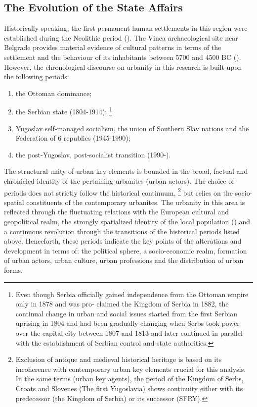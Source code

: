 \documentclass[11pt]{report}
\begin{document}
\subsection{The Evolution of the State Affairs}

Historically speaking, the first permanent human settlements in this region were established during the  Neolithic  period (\href{Krstic}{\citealt{krstic_planerski_1972}}). The Vinca archaeological site near Belgrade provides material evidence of cultural patterns in terms of the settlement and the behaviour of its inhabitants between 5700 and 4500 BC  (\href{Srejovic}{\citealt{srejovic_vincu_1984}}).
\\

However, the chronological discourse on urbanity in this research is built upon the following periods:

\begin{enumerate}
\item the Ottoman dominance;
\item the Serbian state (1804-1914);
\footnote{Even though Serbia officially gained independence from the Ottoman empire only in 1878 and was pro-
claimed the Kingdom of Serbia in 1882, the continual change in urban and social issues started from the first Serbian uprising in 1804 and had been gradually changing when Serbs took power over the capital city between 1807 and 1813 and later continued in parallel with the establishment of Serbian control and state authorities.}
\item Yugoslav self-managed socialism, the union of Southern Slav nations and the Federation of 6 republics (1945-1990);
\item the post-Yugoslav, post-socialist transition (1990-).
\end{enumerate}

The structural unity of urban key elements is bounded in the broad, factual and chronicled identity of the pertaining urbanites (urban actors).
The choice of periods does not strictly follow the historical continuum, \footnote{Exclusion of antique and medieval historical heritage is based on its incoherence with contemporary urban key elements crucial for this analysis. In the same terms (urban key agents), the period of the Kingdom of Serbs, Croats and Slovenes (The first Yugoslavia) shows continuity either with its predecessor (the Kingdom of Serbia) or its successor (SFRY).}
but relies on the socio-spatial constituents of the contemporary urbanites. The urbanity in this area is reflected through the fluctuating relations with the European cultural and geopolitical realm, the strongly spatialized identity of the local population (\href{Savic}{\citealt{savic_where_2014}}) and a continuous revolution   through the transitions of the historical periods listed above. Henceforth, these periods indicate the key points of the alterations and development in terms of: the political sphere, a socio-economic realm, formation of urban actors, urban culture, urban professions and the distribution of urban forms.
\end{document}
